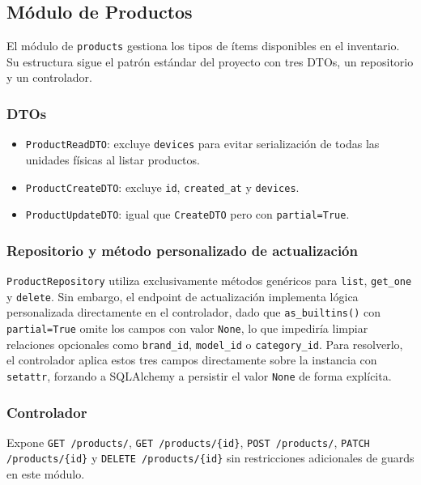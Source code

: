 \subsection{Módulo de Productos}\label{sec:backend_productos}

El módulo de \texttt{products} gestiona los tipos de ítems disponibles en el inventario. Su estructura sigue el patrón estándar del proyecto con tres DTOs, un repositorio y un controlador.

\subsubsection*{DTOs}

\begin{itemize}
	\item \texttt{ProductReadDTO}: excluye \texttt{devices} para evitar serialización de todas las unidades físicas al listar productos.
	\item \texttt{ProductCreateDTO}: excluye \texttt{id}, \texttt{created\_at} y \texttt{devices}.
	\item \texttt{ProductUpdateDTO}: igual que \texttt{CreateDTO} pero con \texttt{partial=True}.
\end{itemize}

\subsubsection*{Repositorio y método personalizado de actualización}

\texttt{ProductRepository} utiliza exclusivamente métodos genéricos para \texttt{list}, \texttt{get\_one} y \texttt{delete}. Sin embargo, el endpoint de actualización implementa lógica personalizada directamente en el controlador, dado que \texttt{as\_builtins()} con \texttt{partial=True} omite los campos con valor \texttt{None}, lo que impediría limpiar relaciones opcionales como \texttt{brand\_id}, \texttt{model\_id} o \texttt{category\_id}. Para resolverlo, el controlador aplica estos tres campos directamente sobre la instancia con \texttt{setattr}, forzando a SQLAlchemy a persistir el valor \texttt{None} de forma explícita.

\subsubsection*{Controlador}

Expone \texttt{GET /products/}, \texttt{GET /products/\{id\}}, \texttt{POST /products/}, \texttt{PATCH /products/\{id\}} y \texttt{DELETE /products/\{id\}} sin restricciones adicionales de guards en este módulo.

